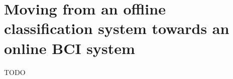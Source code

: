 




\chapter{Moving from an offline classification system towards an online BCI system}
\label{ch:online_bci_system}
TODO
